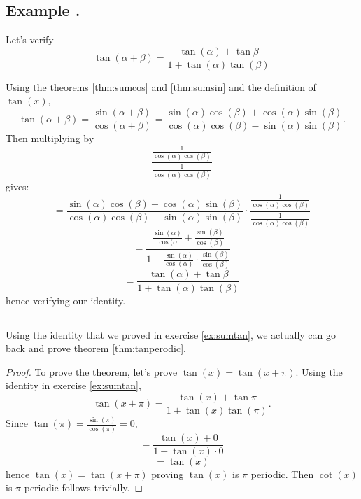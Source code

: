 \documentclass[11pt]{article}
\numberwithin{lemma}{section}
\numberwithin{equation}{section}
\numberwithin{define}{section}
\numberwithin{prop}{section}
\numberwithin{figure}{section}
\numberwithin{theorem}{section}
\numberwithin{cor}{section}
\newcounter{ex}[section]
\newenvironment{ex}[0]{

	\refstepcounter{ex}
    \subsection*{Example \theex .}
    }
    {
    \subsection*{}
    }
\numberwithin{ex}{section}
\begin{document}
\begin{ex}
	Let's verify
	$$\tan(\alpha+\beta)=\frac{\tan(\alpha)+\tan{\beta}}{1+\tan(\alpha)\tan(\beta)}$$
	
	Using the theorems \eqref{thm:sumcos} and \eqref{thm:sumsin} and the definition of $\tan(x)$,
	$$\tan(\alpha+\beta)=\frac{\sin(\alpha+\beta)}{\cos(\alpha+\beta)}
	=\frac{\sin(\alpha)\cos(\beta)+\cos(\alpha)\sin(\beta)}
	{\cos(\alpha)\cos(\beta)-\sin(\alpha)\sin(\beta)}.$$
	Then multiplying by 
	$$\frac{\frac{1}{\cos(\alpha)\cos(\beta)}}{\frac{1}{\cos(\alpha)\cos(\beta)}}$$
	gives:
	$$=\frac{\sin(\alpha)\cos(\beta)+\cos(\alpha)\sin(\beta)}
	{\cos(\alpha)\cos(\beta)-\sin(\alpha)\sin(\beta)}\cdot
	\frac{\frac{1}{\cos(\alpha)\cos(\beta)}}{\frac{1}{\cos(\alpha)\cos(\beta)}}$$
	$$=\frac{\frac{\sin(\alpha)}{\cos(\alpha}+\frac{\sin(\beta)}{\cos(\beta)}}
	{1-\frac{\sin(\alpha)}{\cos(\alpha)}\cdot\frac{\sin(\beta)}{\cos(\beta)}}$$
	$$=\frac{\tan(\alpha)+\tan{\beta}}{1+\tan(\alpha)\tan(\beta)}$$
	hence verifying our identity.
	\label{ex:sumtan}
\end{ex}

Using the identity that we proved in exercise \eqref{ex:sumtan}, we actually can go back and prove theorem \eqref{thm:tanperodic}.
\begin{proof}
	To prove the theorem, let's prove $\tan(x)=\tan(x+\pi)$.
	Using the identity in exercise \eqref{ex:sumtan},
	$$\tan(x+\pi)=
	\frac{\tan(x)+\tan{\pi}}{1+\tan(x)\tan(\pi)}.$$
	Since $\tan(\pi)=\frac{\sin(\pi)}{\cos(\pi)}=0$,
	$$=\frac{\tan(x)+0}{1+\tan(x)\cdot 0}$$
	$$=\tan(x)$$
	hence $\tan(x)=\tan(x+\pi)$ proving $\tan(x)$ is $\pi$ periodic. Then $\cot(x)$ is $\pi$ periodic follows trivially.
\end{proof}
\end{document}

